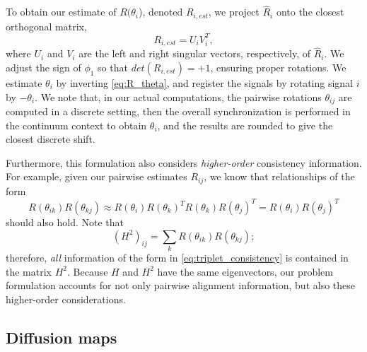 \documentclass[12pt]{article}
\begin{document}
%
To obtain our estimate of $R(\theta_i$), denoted $R_{i, est}$, we project $\hat{R}_i$ onto the closest orthogonal matrix, 
\begin{equation} \label{eq:R_est}
R_{i, est} = U_i V_i^T,
\end{equation}
where $U_i$ and $V_i$ are the left and right singular vectors, respectively, of $\hat{R}_i$.
%
We adjust the sign of $\phi_1$ so that $det(R_{i, est}) = +1$, ensuring proper rotations.
%
We estimate $\theta_{i}$ by inverting \eqref{eq:R_theta}, and register the signals by rotating signal $i$ by $-\theta_i$.
%
We note that, in our actual computations, the pairwise rotations $\theta_{ij}$ are computed in a discrete setting, then the overall
synchronization is performed in the continuum context to obtain $\theta_i$, and the results are rounded to give the closest
discrete shift.

Furthermore, this formulation also considers {\it higher-order} consistency information.
%
For example, given our pairwise estimates $R_{ij}$, we know that relationships of the form
\begin{equation} \label{eq:triplet_consistency}
R(\theta_{ik}) R(\theta_{kj}) \approx R(\theta_i) R(\theta_k)^T R(\theta_k) R(\theta_j)^T = R(\theta_i) R(\theta_j)^T
\end{equation}
should also hold.
%
Note that
\begin{equation}
(H^2)_{ij} = \sum_k R(\theta_{ik}) R(\theta_{kj});
\end{equation}
therefore, {\it all} information of the form in \eqref{eq:triplet_consistency} is contained in the matrix $H^2$.
%
Because $H$ and $H^2$ have the same eigenvectors, our problem formulation accounts for not only pairwise alignment information, but also these higher-order considerations.

\subsection{Diffusion maps \cite{coifman2005geometric}}
\end{document}
